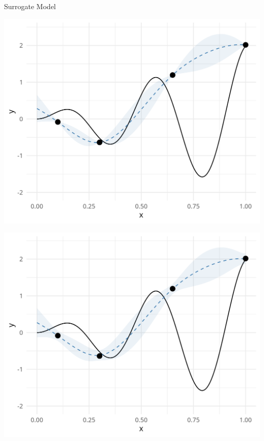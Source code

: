 \documentclass[11pt,compress,t,notes=noshow, xcolor=table]{beamer}
\begin{document}
\begin{vbframe}{Surrogate Model}
\begin{minipage}[b]{0.45\textwidth}
  \includegraphics[width = \textwidth]{figure_man/noisy_1.png}
\end{minipage}
\hfill
\begin{minipage}[b]{0.45\textwidth}
  \includegraphics[width = \textwidth]{figure_man/noisy_2.png}
\end{minipage}

\end{vbframe}
\end{document}
